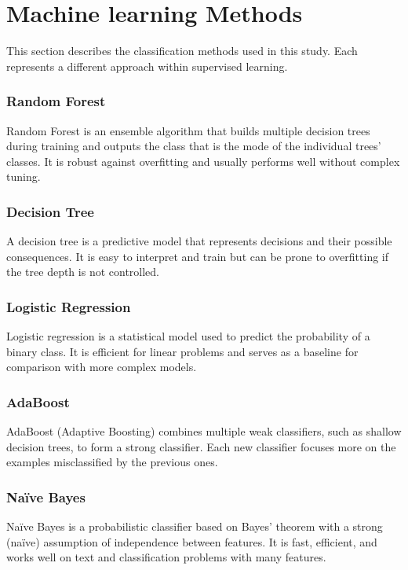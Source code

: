 \section{Machine learning Methods}
This section describes the classification methods used in this study. Each represents a different approach within supervised learning.

\subsubsection{Random Forest}
Random Forest is an ensemble algorithm that builds multiple decision trees during training and outputs the class that is the mode of the individual trees' classes. It is robust against overfitting and usually performs well without complex tuning.

\subsubsection{Decision Tree}
A decision tree is a predictive model that represents decisions and their possible consequences. It is easy to interpret and train but can be prone to overfitting if the tree depth is not controlled.

\subsubsection{Logistic Regression}
Logistic regression is a statistical model used to predict the probability of a binary class. It is efficient for linear problems and serves as a baseline for comparison with more complex models.

\subsubsection{AdaBoost}
AdaBoost (Adaptive Boosting) combines multiple weak classifiers, such as shallow decision trees, to form a strong classifier. Each new classifier focuses more on the examples misclassified by the previous ones.

\subsubsection{Naïve Bayes}
Naïve Bayes is a probabilistic classifier based on Bayes' theorem with a strong (naïve) assumption of independence between features. It is fast, efficient, and works well on text and classification problems with many features.

